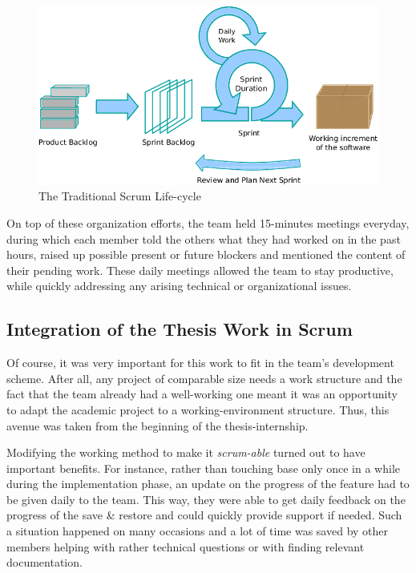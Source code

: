 {\begin{figure}[H]
	\centering
	\includegraphics[width=0.9\linewidth,keepaspectratio]{art/scrum-process.png}
	\caption{The Traditional Scrum Life-cycle\cite{misc:scrum-process}}
	\label{fig:scrum-process}
\end{figure}

On top of these organization efforts, the team held 15-minutes meetings everyday, during which each member told the others what they had worked on in the past hours, raised up possible present or future blockers and mentioned the content of their pending work. These daily meetings allowed the team to stay productive, while quickly addressing any arising technical or organizational issues.

\subsection*{Integration of the Thesis Work in Scrum}
Of course, it was very important for this work to fit in the team's development scheme. After all, any project of comparable size needs a work structure and the fact that the team already had a well-working one meant it was an opportunity to adapt the academic project to a working-environment structure. Thus, this avenue was taken from the beginning of the thesis-internship.

Modifying the working method to make it \textit{scrum-able} turned out to have important benefits. For instance, rather than touching base only once in a while during the implementation phase, an update on the progress of the feature had to be given daily to the team. This way, they were able to get daily feedback on the progress of the save \& restore and could quickly provide support if needed. Such a situation happened on many occasions and a lot of time was saved by other members helping with rather technical questions or with finding relevant documentation. 

}
